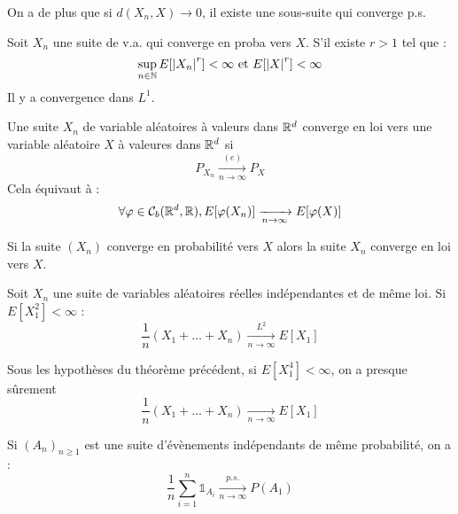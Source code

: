 \documentclass{cours}
\begin{document}
\begin{corollary}
    On a de plus que si $d(X_{n}, X) \rightarrow 0$, il existe une sous-suite qui converge p.s.
\end{corollary}

\begin{corollary}
    Soit $X_{n}$ une suite de v.a. qui converge en proba vers $X$. S'il existe $r > 1$ tel que :
    \[
        \sup_{n \in \mathbb{N}} E[\left|X_{n}\right|^{r}] < \infty \text{ et } E[\left|X\right|^{r}] < \infty
    \]
    Il y a convergence dans $L^{1}$.
\end{corollary}

\begin{definition}
    
    Une suite $X_{n}$ de variable aléatoires à valeurs dans $\mathbb{R}^{d}$ converge en loi vers une variable aléatoire $X$ à valeures dans $\mathbb{R}^{d}$ si
    \[
        P_{X_{n}} \xrightarrow[n \to \infty]{(e)} P_{X}
    \]
    Cela équivaut à :
    \[
        \forall \varphi \in \mathcal{C}_{b}(\mathbb{R}^{d}, \mathbb{R}), E[\varphi(X_{n})] \xrightarrow[n \to \infty]{} E[\varphi(X)]
    \]
\end{definition}

\begin{proposition}
    Si la suite $\left(X_{n}\right)$ converge en probabilité vers $X$ alors la suite $X_{n}$ converge en loi vers $X$.
\end{proposition}


\begin{theorem}
    Soit $X_{n}$ une suite de variables aléatoires réelles indépendantes et de même loi. Si $E[X_{1}^{2}] < \infty$ :
    \[
        \frac{1}{n}\left(X_{1} + \ldots + X_{n}\right) \xrightarrow[n \to \infty]{L^{2}} E[X_{1}]
    \]
\end{theorem}

\begin{proposition}
    Sous les hypothèses du théorème précédent, si $E\left[X_{1}^{4}\right] < \infty$, on a presque sûrement
    \[
        \frac{1}{n}\left(X_{1} + \ldots + X_{n}\right) \xrightarrow[n \to \infty]{} E[X_{1}]
    \]
\end{proposition}

\begin{corollary}
    Si $\left(A_{n}\right)_{n \geq 1}$ est une suite d'évènements indépendants de même probabilité, on a :
    \[
        \frac{1}{n}\sum_{i = 1}^{n}\mathds{1}_{A_{i}} \xrightarrow[n \to \infty]{p.s.} P(A_{1})
    \]
\end{corollary}
\end{document}
